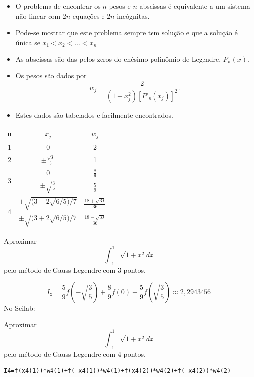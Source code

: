 \begin{itemize}
\item O problema de encontrar os $n$ pesos e $n$ abscissas é equivalente a um sistema não linear com $2n$ equações e $2n$ incógnitas.
\item Pode-se mostrar que este problema sempre tem solução e que a solução é única se $x_1<x_2<\ldots <x_n$
\item As abscissas são das pelos zeros do enésimo polinômio de Legendre, $P_n(x)$.
\item Os pesos são dados por
$$w_j = \frac{2}{\left( 1-x_j^2 \right) [P'_n(x_j)]^2}.$$
\item Estes dados são tabelados e facilmente encontrados.
\end{itemize}

\begin{tabular}{|c|c|c|}\hline
n&$x_j$&$w_j$\\\hline
1& 0 & 2\\\hline
2& $\displaystyle \pm \frac{\sqrt{3}}{3}$ & 1\\\hline
\multirow{2}{*}{3} &0& $\displaystyle \frac{8}{9}$\\
& $\displaystyle \pm \sqrt{\frac{3}{5}}$ & $\displaystyle \frac{5}{9}$ \\\hline
\multirow{2}{*}{4} & $\displaystyle \pm\sqrt{\Big( 3 - 2\sqrt{6/5} \Big)/7}$ & $\displaystyle \tfrac{18+\sqrt{30}}{36}$\\
& $\displaystyle \pm\sqrt{\Big( 3 + 2\sqrt{6/5} \Big)/7}$ & $\displaystyle \tfrac{18-\sqrt{30}}{36}$\\\hline
\end{tabular}

\begin{ex} Aproximar
  \begin{equation*}
    \int_{-1}^1\sqrt{1+x^2}dx  
  \end{equation*}
pelo método de Gauss-Legendre com 3 pontos.
\end{ex}
\begin{sol}
 \begin{equation*}
  I_3=\frac{5}{9}f\left(-\sqrt{\frac{3}{5}}\right)+\frac{8}{9}f(0)+\frac{5}{9}f\left(\sqrt{\frac{3}{5}}\right) \approx 2,2943456
\end{equation*}
\ifisscilab
No Scilab:

\fi 
\end{sol}

\ifisscilab
\begin{ex} Aproximar
$$\int_{-1}^1\sqrt{1+x^2}dx$$
pelo método de Gauss-Legendre com 4 pontos.
\end{ex}
\begin{sol}
\begin{verbatim}
I4=f(x4(1))*w4(1)+f(-x4(1))*w4(1)+f(x4(2))*w4(2)+f(-x4(2))*w4(2)
\end{verbatim}  
\end{sol}
\fi


